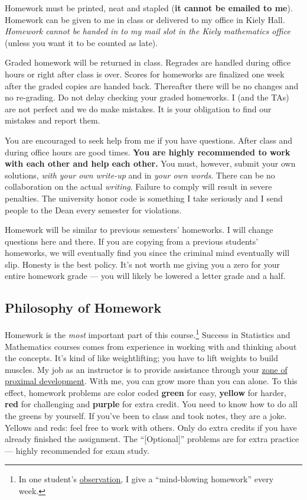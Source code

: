 \documentclass[12pt]{article}
\newcommand{\ingreen}[1]{\color{green}\textbf{#1} \color{black}}
\newcommand{\inyellow}[1]{\color{yellow}\textbf{#1} \color{black}}
\newcommand{\inred}[1]{\color{red}\textbf{#1} \color{black}}
\newcommand{\inpurple}[1]{\color{purple}\textbf{#1} \color{black}}
\newcommand{\qu}[1]{``#1''}
\begin{document}
Homework must be printed, neat and stapled (\textbf{it cannot be emailed to me}). Homework can be given to me in class or delivered to my office in Kiely Hall. \textit{Homework cannot be handed in to my mail slot in the Kiely mathematics office} (unless you want it to be counted as late).

Graded homework will be returned in class. Regrades are handled during office hours or right after class is over. Scores for homeworks are finalized one week after the graded copies are handed back. Thereafter there will be no changes and no re-grading. Do not delay checking your graded homeworks. I (and the TAs) are not perfect and we do make mistakes. It is your obligation to find our mistakes and report them.

You are encouraged to seek help from me if you have questions. After class and during office hours are good times. \ingreen{You are highly recommended to work with each other and help each other.} You must, however, submit your own solutions, \textit{with your own write-up} and in \textit{your own words}. There can be no collaboration on the actual \textit{writing}. Failure to comply will result in severe penalties. The university honor code is something I take seriously and I send people to the Dean every semester for violations.

Homework will be similar to previous semesters' homeworks. I will change questions here and there. If you are copying from a previous students' homeworks, we will eventually find you since the criminal mind eventually will slip. Honesty is the best policy. It's not worth me giving you a zero for your entire homework grade --- you will likely be lowered a letter grade and a half.

\subsection*{Philosophy of Homework}


Homework is the \textit{most} important part of this course.\footnote{In one student's \href{http://www.ratemyprofessors.com/ShowRatings.jsp?tid=1951051}{observation}, I give a \qu{mind-blowing homework} every week.} Success in Statistics and Mathematics courses comes from experience in working with and thinking about the concepts. It's kind of like weightlifting; you have to lift weights to build muscles. My job as an instructor is to provide assistance through your \href{http://en.wikipedia.org/wiki/Zone_of_proximal_development}{zone of proximal development}. With me, you can grow more than you can alone. To this effect, homework problems are color coded \ingreen{green} for easy, \inyellow{yellow} for harder, \inred{red} for challenging and \inpurple{purple} for extra credit. You need to know how to do all the greens by yourself. If you've been to class and took notes, they are a joke. Yellows and reds: feel free to work with others. Only do extra credits if you have already finished the assignment. The \qu{[Optional]} problems are for extra practice --- highly recommended for exam study.
\end{document}
